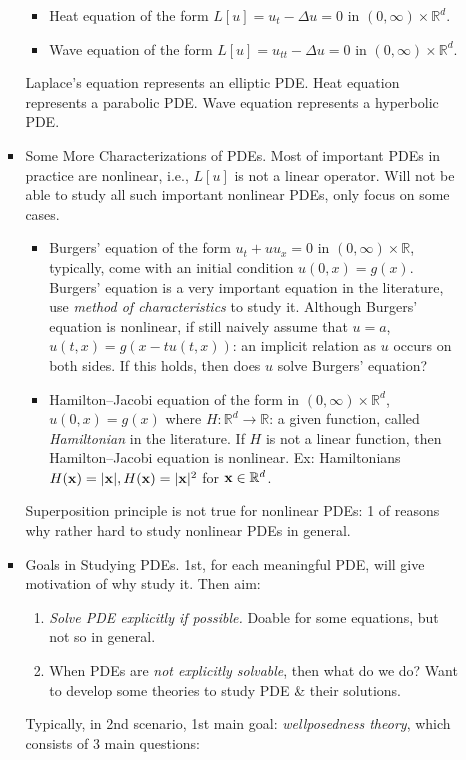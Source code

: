 \documentclass{article}
\begin{document}
\begin{enumerate}
\begin{itemize}
\begin{itemize}
\begin{itemize}
				\item {\sf Heat equation} of the form $L[u] = u_t - \Delta u = 0$ in $(0,\infty)\times\mathbb{R}^d$.
				\item {\sf Wave equation} of the form $L[u] = u_{tt} - \Delta u = 0$ in $(0,\infty)\times\mathbb{R}^d$.
			\end{itemize}
			Laplace's equation represents an elliptic PDE. Heat equation represents a parabolic PDE. Wave equation represents a hyperbolic PDE.
			\item {\sf Some More Characterizations of PDEs.} Most of important PDEs in practice are nonlinear, i.e., $L[u]$ is not a linear operator. Will not be able to study all such important nonlinear PDEs, only focus on some cases.
			\begin{itemize}
				\item {\sf Burgers' equation} of the form $u_t + uu_x = 0$ in $(0,\infty)\times\mathbb{R}$, typically, come with an initial condition $u(0,x) = g(x)$. Burgers' equation is a very important equation in the literature, use {\it method of characteristics} to study it. Although Burgers' equation is nonlinear, if still naively assume that $u = a$, $u(t,x) = g(x - tu(t,x))$: an implicit relation as $u$ occurs on both sides. If this holds, then does $u$ solve Burgers' equation?
				\item {\sf Hamilton--Jacobi equation} of the form  in $(0,\infty)\times\mathbb{R}^d$, $u(0,x) = g(x)$ where $H:\mathbb{R}^d\to\mathbb{R}$: a given function, called {\it Hamiltonian} in the literature. If $H$ is not a linear function, then Hamilton--Jacobi equation is nonlinear. Ex: Hamiltonians $H({\bf x}) = |{\bf x}|,H({\bf x}) = |{\bf x}|^2$ for ${\bf x}\in\mathbb{R}^d$.
			\end{itemize}
			Superposition principle is not true for nonlinear PDEs: 1 of reasons why rather hard to study nonlinear PDEs in general.
			\item {\sf Goals in Studying PDEs.} 1st, for each meaningful PDE, will give motivation of why study it. Then aim:
			\begin{enumerate}
				\item {\it Solve PDE explicitly if possible.} Doable for some equations, but not so in general.
				\item When PDEs are {\it not explicitly solvable}, then what do we do? Want to develop some theories to study PDE \& their solutions.
			\end{enumerate}
			Typically, in 2nd scenario, 1st main goal: {\it wellposedness theory}, which consists of 3 main questions:

\end{itemize}
\end{itemize}
\end{enumerate}
\end{document}
